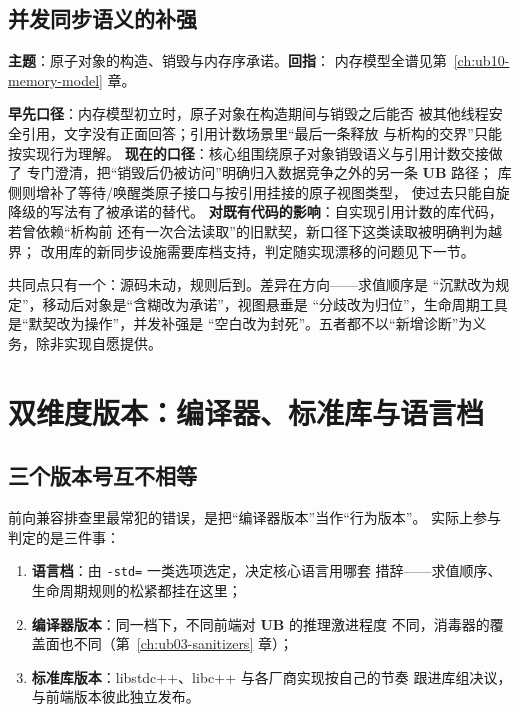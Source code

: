 \documentclass[12pt,a4paper,fontset=fandol]{ctexbook}
\newcommand{\Tp}[1]{\texttt{#1}}
\newcommand{\UB}{\textbf{\textsf{UB}}}
\begin{document}
\subsection{并发同步语义的补强}

\textbf{主题}：原子对象的构造、销毁与内存序承诺。\textbf{回指}：
内存模型全谱见第~\ref{ch:ub10-memory-model} 章。

\textbf{早先口径}：内存模型初立时，原子对象在构造期间与销毁之后能否
被其他线程安全引用，文字没有正面回答；引用计数场景里“最后一条释放
与析构的交界”只能按实现行为理解。
\textbf{现在的口径}：核心组围绕原子对象销毁语义与引用计数交接做了
专门澄清，把“销毁后仍被访问”明确归入数据竞争之外的另一条 \UB{} 路径；
库侧则增补了等待/唤醒类原子接口与按引用挂接的原子视图类型，
使过去只能自旋降级的写法有了被承诺的替代。
\textbf{对既有代码的影响}：自实现引用计数的库代码，若曾依赖“析构前
还有一次合法读取”的旧默契，新口径下这类读取被明确判为越界；
改用库的新同步设施需要库档支持，判定随实现漂移的问题见下一节。

\begin{compare}[title=五组口径变化的共同形状]
共同点只有一个：源码未动，规则后到。差异在方向——求值顺序是
“沉默改为规定”，移动后对象是“含糊改为承诺”，视图悬垂是
“分歧改为归位”，生命周期工具是“默契改为操作”，并发补强是
“空白改为封死”。五者都不以“新增诊断”为义务，除非实现自愿提供。
\end{compare}

\section{双维度版本：编译器、标准库与语言档}\label{sec:ub15-versions}

\subsection{三个版本号互不相等}

前向兼容排查里最常犯的错误，是把“编译器版本”当作“行为版本”。
实际上参与判定的是三件事：

\begin{enumerate}
  \item \textbf{语言档}：由 \Tp{-std=} 一类选项选定，决定核心语言用哪套
        措辞——求值顺序、生命周期规则的松紧都挂在这里；
  \item \textbf{编译器版本}：同一档下，不同前端对 \UB{} 的推理激进程度
        不同，消毒器的覆盖面也不同（第~\ref{ch:ub03-sanitizers} 章）；
  \item \textbf{标准库版本}：libstdc++、libc++ 与各厂商实现按自己的节奏
        跟进库组决议，与前端版本彼此独立发布。
\end{enumerate}
\end{document}
